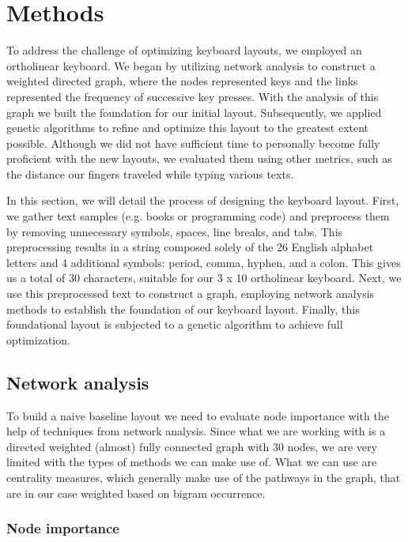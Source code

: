 \documentclass[9pt,twocolumn,twoside]{pnas-report}
\begin{document}
{\small

\section*{Methods}

To address the challenge of optimizing keyboard layouts, we employed an ortholinear keyboard.
We began by utilizing network analysis to construct a weighted directed graph, where the nodes represented keys and the links represented the frequency of successive key presses.
With the analysis of this graph we built the foundation for our initial layout.
Subsequently, we applied genetic algorithms to refine and optimize this layout to the greatest extent possible.
Although we did not have sufficient time to personally become fully proficient with the new layouts, we evaluated them using other metrics, such as the distance our fingers traveled while typing various texts.

In this section, we will detail the process of designing the keyboard layout.
First, we gather text samples (e.g. books or programming code) and preprocess them by removing unnecessary symbols, spaces, line breaks, and tabs.
This preprocessing results in a string composed solely of the 26 English alphabet letters and 4 additional symbols: period, comma, hyphen, and a colon.
This gives us a total of 30 characters, suitable for our 3 x 10 ortholinear keyboard.
Next, we use this preprocessed text to construct a graph, employing network analysis methods to establish the foundation of our keyboard layout.
Finally, this foundational layout is subjected to a genetic algorithm to achieve full optimization.

\subsection*{Network analysis}

To build a naive baseline layout we need to evaluate node importance with the help of techniques from network analysis.
Since what we are working with is a directed weighted (almost) fully connected graph with 30 nodes, we are very limited with the types of methods we can make use of.
What we can use are centrality measures, which generally make use of the pathways in the graph, that are in our case weighted based on bigram occurrence.

\subsubsection*{Node importance}

}
\end{document}
